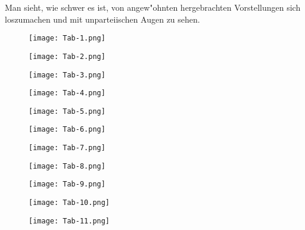 \documentclass[a4paper, 11pt, oneside, german]{article}
\begin{document}
Man sieht, wie schwer es ist, von angew"ohnten hergebrachten Vorstellungen sich loszumachen und mit unparteiischen Augen zu sehen.
\clearpage
\begin{figure}[b]
\caption{}
\texttt{[image: Tab-1.png]}
\centering
\end{figure}
\clearpage
\begin{figure}[b]
\caption{}
\texttt{[image: Tab-2.png]}
\centering
\end{figure}
\clearpage
\begin{figure}[b]
\caption{}
\texttt{[image: Tab-3.png]}
\centering
\end{figure}
\clearpage
\begin{figure}[b]
\caption{}
\texttt{[image: Tab-4.png]}
\centering
\end{figure}
\clearpage
\begin{figure}[b]
\caption{}
\texttt{[image: Tab-5.png]}
\centering
\end{figure}
\clearpage
\begin{figure}[b]
\caption{}
\texttt{[image: Tab-6.png]}
\centering
\end{figure}
\clearpage
\begin{figure}[b]
\caption{}
\texttt{[image: Tab-7.png]}
\centering
\end{figure}
\clearpage
\begin{figure}[b]
\caption{}
\texttt{[image: Tab-8.png]}
\centering
\end{figure}
\clearpage
\begin{figure}[b]
\caption{}
\texttt{[image: Tab-9.png]}
\centering
\end{figure}
\clearpage
\begin{figure}[b]
\caption{}
\texttt{[image: Tab-10.png]}
\centering
\end{figure}
\clearpage
\begin{figure}[b]
\caption{}
\texttt{[image: Tab-11.png]}
\centering
\end{figure}
\end{document}
